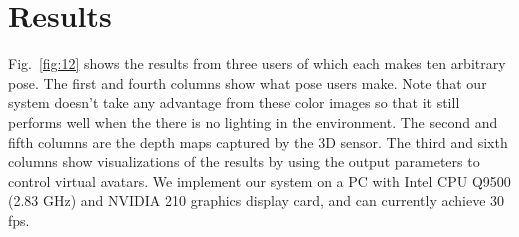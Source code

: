 \section{Results}
\label{sec:4}
Fig.~\ref{fig:12} shows the results from three users of which each makes ten arbitrary pose. The first and fourth columns show what pose users make. Note that our system doesn’t take any advantage from these color images so that it still performs well when the there is no lighting in the environment. The second and fifth columns are the depth maps captured by the 3D sensor. The third and sixth columns show visualizations of the results by using the output parameters to control virtual avatars. We implement our system on a PC with Intel CPU Q9500 (2.83 GHz) and NVIDIA 210 graphics display card, and can currently achieve 30 fps.

